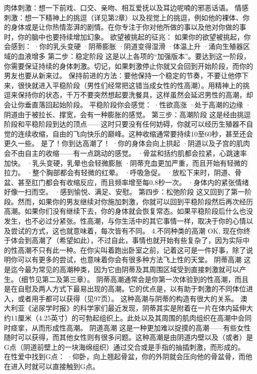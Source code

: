 \documentclass[12pt,UTF8]{ctexbook}
\begin{document}
肉体刺激：想一下前戏、口交、亲吻、相互爱抚以及耳边呢喃的邪恶话语。
情感刺激：想一下精神上的挑逗（详见第2章）以及视觉上的挑逗，例如他的裸体、你的身体或是让你热情澎湃的剧情。在你专注于你对他所做的事以及他对你做的事时，你的脑中也要持续增加幻象。
欲望被挑起的征兆：
如果你的欲望被挑起，你会感到：
·你的乳头变硬
·阴蒂膨胀
·阴道变得湿滑
·体温上升
·涌向生殖器区域的血液增多
第二步：稳定阶段
这是以上各项的“加强版本”。要达到这一阶段，你需要保证持续的身体刺激。切记，如果刺激停止你就又会回到开始阶段，而你的男友也要从新来过。
保持前进的方法：要他保持一个稳定的节奏，不要让他停下来，很快就进入平稳阶段（男性们经常把这错当成女性的性高潮）。用精神上的挑逗来保持你的状态，千万不要突然想起要洗餐具，这样虽然会延迟男性的高潮，却会让你垂直落回起始阶段。
平稳阶段你会感觉：
·性欲高涨
·处于高潮的边缘
·阴道由于被拉长、撑宽，会有一种膨胀的感觉。
第三步：高潮阶段
这是经由挑逗阶段和平稳阶段到达的顶点——这时只要没有任何妨碍，你就可以经历生殖器不自觉的连续收缩，自由的飞向快乐的巅峰。这种收缩通常要持续10至60秒，甚至还会更久一些。
是了！你到达高潮了！
·你的身体会向上拱起
·阴道以及子宫的肌肉会不由自主的收缩——有一点跳动的感觉。
·骨盆和括约肌都会拉紧，心跳速率加快。
·乳头变硬，乳晕也会轻微膨胀
·阴蒂充血更加严重，而且开始有轻微的拉力。
·整个胸部都会有轻微的红晕。
·呼吸急促。
·放松下来时，阴道、骨盆、甚至肛门都会有收缩反应，而且频率增至每0.8秒一次。
·身体内的紧张情绪好像一扫而空。
·感到愉悦、满足、安慰。
第四步：松弛阶段
这又回到了第一阶段。然而，如果你的男友继续对你施加刺激，你就可以回到平稳阶段然后再次经历高潮。如果你们没有继续下去，你的身体就会恢复常态。如果平稳阶段后什么也没发生，也不必过分紧张。性高潮，与你生活中的其它事情一样，取决于你的心情以及尝试的方式，这也就意味着，每次皆有不同。
4.不同种类的高潮
OK, 现在你终于体会到高潮了（希望如此），不过自此，事情也就开始有些复杂了，因为实际中的性高潮不只有此一种。在你尖叫着跑出卧室之前，记着这可是一件好事，除了说明你可以有更多的尝试，也意味着你会有很多种方法飞上性的天堂。
阴蒂高潮
这是迄今最为常见的高潮种类，因为它由阴蒂及其周围区域受到直接刺激就可以产生。（细节见第二及第三章）。
阴蒂高潮通常会是你第一次体验到的性高潮，而且是在自慰及两人方式下最易出现的高潮。它的优点是，以有助于刺激的不同体位进入，或者用手都可以获得（见97页）。
这种高潮与阴蒂的构造有很大的关系。
澳大利亚《泌尿学时报》的科学家们最近发现，阴蒂其实是附着在一片在体内延伸大约11厘米（4.25英寸）的可勃起组织上。此处以及其周围的肌肉组织在高潮中会同时痉挛，从而形成性高潮。
阴道高潮
这是一种更加难以捉摸的高潮——有些女性随时可以获得，而其他女性则有很多问题。这种高潮是由阴道内壁以及（或者）是G点（阴道前壁上的一块海绵组织）通过交合或是手指的抽插刺激，而形成的。
在性爱中找到G点：
·仰卧，向上翘起骨盆，你的外阴就会压向他的骨盆骨，而他在进入时就可以直接触到G点。
\end{document}
